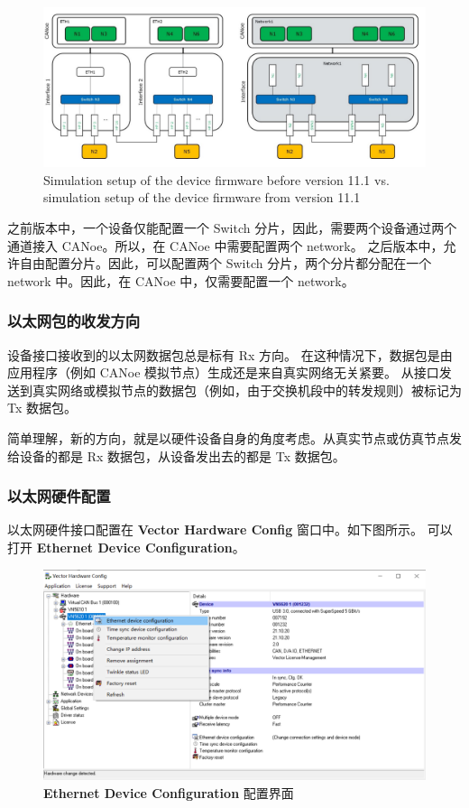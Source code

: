 \begin{figure}[ht]
    \centering
    \includegraphics[scale=0.6]{pic/Snipaste_2021-10-29_14-42-44.png}
    \caption{ Simulation setup of the device firmware before version 11.1 vs. simulation setup of the device firmware from version 11.1}
    \label{fig:two_setup}
\end{figure}

之前版本中，一个设备仅能配置一个 Switch 分片，因此，需要两个设备通过两个通道接入 CANoe。所以，在 CANoe 中需要配置两个 network。
之后版本中，允许自由配置分片。因此，可以配置两个 Switch 分片，两个分片都分配在一个 network 中。因此，在 CANoe 中，仅需要配置一个 network。

\subsubsection{以太网包的收发方向}
设备接口接收到的以太网数据包总是标有 Rx 方向。 在这种情况下，数据包是由应用程序（例如 CANoe 模拟节点）生成还是来自真实网络无关紧要。
从接口发送到真实网络或模拟节点的数据包（例如，由于交换机段中的转发规则）被标记为 Tx 数据包。 
\begin{note}
    简单理解，新的方向，就是以硬件设备自身的角度考虑。从真实节点或仿真节点发给设备的都是 Rx 数据包，从设备发出去的都是 Tx 数据包。
\end{note}

\subsubsection{以太网硬件配置}
以太网硬件接口配置在 \textbf{Vector Hardware Config} 窗口中。如下图所示。
可以打开 \textbf{Ethernet Device Configuration}。

\begin{figure}[ht]
    \centering
    \includegraphics[scale=0.6]{pic/Snipaste_2021-10-29_15-00-01.png}
    \caption{ \textbf{Ethernet Device Configuration} 配置界面}
    \label{fig:Ethernet_Device_Configuration}
\end{figure}

